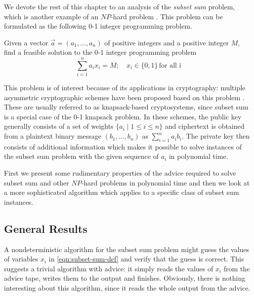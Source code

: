 We devote the rest of this chapter to an analysis of the \emph{subset sum}
problem, which is another example of an $NP$-hard problem
\cite{subset-sum-np-hard}. This problem can be formulated as the
following 0-1 integer programming problem.

\begin{definition}\label{definition:subset-sum}
    Given a vector $\vec{a} = (a_1, \dots, a_n)$ of positive integers and
    a positive integer $M$, find a feasible solution to the 0-1 integer
    programming problem
    \begin{equation}\label{eqn:subset-sum-def}
        \sum_{i=1}^n a_ix_i = M; \quad x_i \in \{0,1\} \, \text{for all i}
    \end{equation}
\end{definition}

This problem is of interest because of its applications in cryptography:
multiple asymmetric cryptographic schemes have been proposed based on this
problem \cite{merkle-hellman, chor-rivest}. These are usually referred to
as knapsack-based cryptosystems, since subset sum is a special case of the
0-1 knapsack problem. In these schemes, the public key generally consists
of a set of weights $\{a_i \mid 1 \leq i \leq n\}$ and ciphertext is
obtained from a plaintext binary message $(b_1, \dots, b_n)$ as
$\sum_{i=1}^n a_ib_i$. The private key then consists of additional
information which makes it possible to solve instances of the subset sum
problem with the given sequence of $a_i$ in polynomial time.

First we present some rudimentary properties of the advice required to
solve subset sum and other $NP$-hard problems in polynomial time and then
we look at a more sophisticated algorithm which applies to a specific
class of subset sum instances.

\subsection{General Results}
\label{section:subset-sum-general}

A nondeterministic algorithm for the subset sum problem might guess the
values of variables $x_i$ in \eqref{eqn:subset-sum-def} and verify that
the guess is correct. This suggests a trivial algorithm with advice: it
simply reads the values of $x_i$ from the advice tape, writes them to the
output and finishes. Obviously, there is nothing interesting about this
algorithm, since it reads the whole output from the advice.

